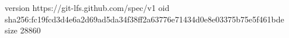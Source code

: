 version https://git-lfs.github.com/spec/v1
oid sha256:fc19fcd3d4e6a2d69ad5da34f38ff2a63776e71434d0e8e03375b75e5f461bde
size 28860
